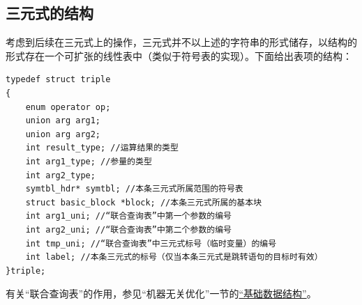 \subsection{三元式的结构}
\label{triplestruct}
考虑到后续在三元式上的操作，三元式并不以上述的字符串的形式储存，以结构的形式存在一个可扩张的线性表中（类似于符号表的实现）。下面给出表项的结构：
\begin{lstlisting}
typedef struct triple
{
	enum operator op;
	union arg arg1;
	union arg arg2;
	int result_type; //运算结果的类型
	int arg1_type; //参量的类型
	int arg2_type; 
	symtbl_hdr* symtbl; //本条三元式所属范围的符号表
	struct basic_block *block; //本条三元式所属的基本块
	int arg1_uni; //“联合查询表”中第一个参数的编号
	int arg2_uni; //“联合查询表”中第二个参数的编号
	int tmp_uni; //“联合查询表”中三元式标号（临时变量）的编号
	int label; //本条三元式的标号（仅当本条三元式是跳转语句的目标时有效）
}triple;
\end{lstlisting}
有关“联合查询表”的作用，参见“机器无关优化”一节的\hyperref[jointtable]{“基础数据结构”}。
